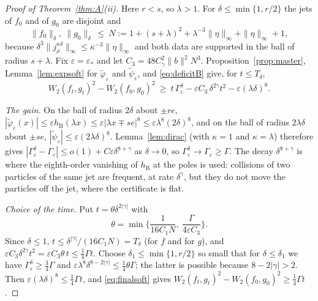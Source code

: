 \documentclass[11pt]{amsart}
\theoremstyle{definition}
\newcommand{\nb}{\|b\|}
\newcommand{\hB}{h_{\mathrm B}}
\begin{document}
\begin{proof}[Proof of Theorem~\ref{thm:A}\textup{(ii)}]
Here $r<s$, so $\lambda>1$. For $\delta\le\min\{1,r/2\}$ the jets of $f_0$ and of $g_0$ are disjoint and
\[
\|f_0\|_\delta,\ \|g_0\|_\delta\ \le\ N:=1+(s+\lambda)^2+\lambda^{-3}\|\eta\|_\infty+\|\eta\|_\infty+1,
\]
because $\delta^3\|j^{\kappa\delta}_\rho\|_\infty\le\kappa^{-3}\|\eta\|_\infty$ and both data are supported in the ball of radius $s+\lambda$. Fix $\varepsilon=\varepsilon_*$ and let $C_3=48C_\gamma^2\nb^2N^3$. Proposition~\ref{prop:master}, Lemma~\ref{lem:expsoft} for $\tilde\varphi_\varepsilon$ and $\tilde\psi_\varepsilon$, and \eqref{eq:deficitB} give, for $t\le T_\delta$,
\begin{equation}\label{eq:finalsoft}
W_2(f_t,g_t)^2-W_2(f_0,g_0)^2\ \ge\ t\,\Gamma^\delta_\varepsilon-\varepsilon C_3\,\delta^{2\gamma}t^2-\varepsilon(\lambda\delta)^8 .
\end{equation}

\emph{The gain.} On the ball of radius $2\delta$ about $\pm re$, $|\tilde\varphi_\varepsilon(x)|\le\varepsilon\hB(\lambda x)\le\varepsilon|\lambda x\mp se|^8\le\varepsilon\lambda^8(2\delta)^8$, and on the ball of radius $2\lambda\delta$ about $\pm se$, $|\tilde\psi_\varepsilon|\le\varepsilon(2\lambda\delta)^8$. Lemma~\ref{lem:dirac} (with $\kappa=1$ and $\kappa=\lambda$) therefore gives $|\Gamma^\delta_\varepsilon-\Gamma_\varepsilon|\le o(1)+C\varepsilon\delta^{8+\gamma}$ as $\delta\to0$, so $\Gamma^\delta_\varepsilon\to\Gamma_\varepsilon\ge\Gamma$. The decay $\delta^{8+\gamma}$ is where the eighth-order vanishing of $\hB$ at the poles is used: collisions of two particles of the same jet are frequent, at rate $\delta^\gamma$, but they do not move the particles off the jet, where the certificate is flat.

\emph{Choice of the time.} Put $t=\theta\delta^{2|\gamma|}$ with
\[
\theta=\min\Big\{\frac{1}{16C_1N},\ \frac{\Gamma}{4\varepsilon C_3}\Big\}.
\]
Since $\delta\le1$, $t\le\delta^{|\gamma|}/(16C_1N)=T_\delta$ (for $f$ and for $g$), and $\varepsilon C_3\delta^{2\gamma}t^2=\varepsilon C_3\theta\,t\le\frac14\Gamma t$. Choose $\delta_1\le\min\{1,r/2\}$ so small that for $\delta\le\delta_1$ we have $\Gamma^\delta_\varepsilon\ge\frac34\Gamma$ and $\varepsilon\lambda^8\delta^{8-2|\gamma|}\le\frac14\theta\Gamma$; the latter is possible because $8-2|\gamma|>2$. Then $\varepsilon(\lambda\delta)^8\le\frac14\Gamma t$, and \eqref{eq:finalsoft} gives $W_2(f_t,g_t)^2-W_2(f_0,g_0)^2\ge\frac14\Gamma t$.
\end{proof}
\end{document}
